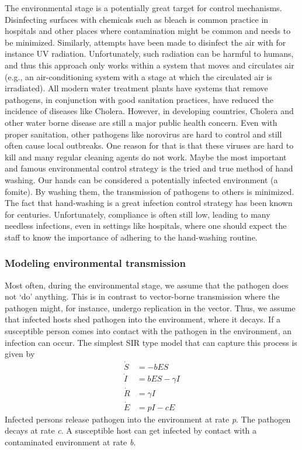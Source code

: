 \documentclass[]{book}
\theoremstyle{definition}
\theoremstyle{definition}
\theoremstyle{definition}
\theoremstyle{remark}
\begin{document}
The environmental stage is a potentially great target for control
mechanisms. Disinfecting surfaces with chemicals such as bleach is
common practice in hospitals and other places where contamination might
be common and needs to be minimized. Similarly, attempts have been made
to disinfect the air with for instance UV radiation. Unfortunately, such
radiation can be harmful to humans, and thus this approach only works
within a system that moves and circulates air (e.g., an air-conditioning
system with a stage at which the circulated air is irradiated). All
modern water treatment plants have systems that remove pathogens, in
conjunction with good sanitation practices, have reduced the incidence
of diseases like Cholera. However, in developing countries, Cholera and
other water borne disease are still a major public health concern. Even
with proper sanitation, other pathogens like norovirus are hard to
control and still often cause local outbreaks. One reason for that is
that these viruses are hard to kill and many regular cleaning agents do
not work. Maybe the most important and famous environmental control
strategy is the tried and true method of hand washing. Our hands can be
considered a potentially infected environment (a fomite). By washing
them, the transmission of pathogens to others is minimized. The fact
that hand-washing is a great infection control strategy has been known
for centuries. Unfortunately, compliance is often still low, leading to
many needless infections, even in settings like hospitals, where one
should expect the staff to know the importance of adhering to the
hand-washing routine.

\subsubsection{Modeling environmental transmission}\label{myadvancedbox}

Most often, during the environmental stage, we assume that the pathogen
does not `do' anything. This is in contrast to vector-borne transmission
where the pathogen might, for instance, undergo replication in the
vector. Thus, we assume that infected hosts shed pathogen into the
environment, where it decays. If a susceptible person comes into contact
with the pathogen in the environment, an infection can occur. The
simplest SIR type model that can capture this process is given by \[ 
\begin{aligned}
\dot S &= - b E S \\
\dot I &= b E S  - \gamma I \\
\dot R &= \gamma I \\
\dot E &= p I - cE
\end{aligned}
\] Infected persons release pathogen into the environment at rate
\emph{p}. The pathogen decays at rate \emph{c}. A susceptible host can
get infected by contact with a contaminated environment at rate
\emph{b}.
\end{document}
